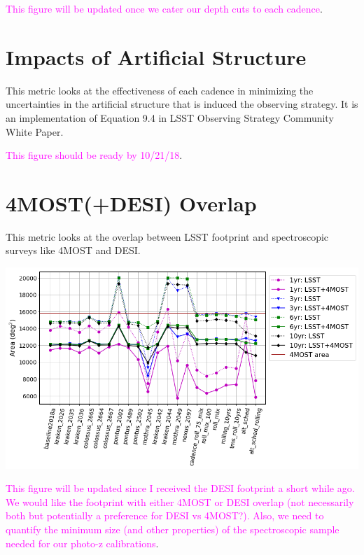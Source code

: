 \documentclass[a4paper,10pt]{article}
\newcommand{\cl}[1]{\textcolor{magenta}{#1}}
\begin{document}
\cl{This figure will be updated once we cater our depth cuts to each cadence}.

\newpage 
\section*{Impacts of Artificial Structure\label{OS systematics}}
This metric looks at the effectiveness of each cadence in minimizing the uncertainties in the artificial structure that is induced the observing strategy. It is an implementation of Equation 9.4 in LSST Observing Strategy Community White Paper.

\cl{This figure should be ready by 10/21/18}.

\begin{minipage}{\columnwidth}
\vspace*{2em}
\centering
\vspace*{2em}
\end{minipage}

\newpage
\section*{4MOST(+DESI) Overlap\label{4MOST+DESI overlap}}
This metric looks at the overlap between LSST footprint and spectroscopic surveys like 4MOST and DESI.

\begin{minipage}{\columnwidth}
\vspace*{2em}
\centering
 \includegraphics[width=.8\columnwidth]{lss_compare_4MOSToverlap_22dbs.png}
\vspace*{2em}
\end{minipage}

\cl{This figure will be updated since I received the DESI footprint a short while ago. We would like the footprint with either 4MOST or DESI overlap (not necessarily both but potentially a preference for DESI vs 4MOST?). Also, we need to quantify the minimum size (and other properties) of the spectroscopic sample needed for our photo-z calibrations}.
\end{document}
